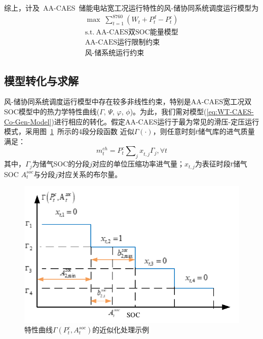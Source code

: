 综上，计及~AA-CAES~储能电站宽工况运行特性的风-储协同系统调度运行模型为\cite{CAES-Wind-Rui-19}
\begin{subequations}
\label{eq:WT-CAES-Co-Gen-Model}
\begin{gather}
\max \;\sum\limits_{t = 1}^{8760} {({W_t} + P_t^d - P_t^c)}\label{eq:CAES-Hub-dispatch-obj}\\
\mbox{s.t.}~
\mbox{AA-CAES双SOC能量模型}\\
\mbox{AA-CAES运行限制约束}\\
\mbox{风-储系统运行约束} 
\end{gather}
\end{subequations}

\subsection{模型转化与求解}
\label{sec:wind-ESS-operation-model-appro}

风-储协同系统调度运行模型中存在较多非线性约束，特别是AA-CAES宽工况双SOC模型中的热力学特性曲线($\Gamma$, $\Psi$, $\varphi$, $\phi$)。为此，我们需对模型(\ref{eq:WT-CAES-Co-Gen-Model})进行相应的转化。假定AA-CAES运行于最为常见的滑压-定压运行模式，采用图~\ref{fig:dual-SOC-approx}~所示的4段分段函数
\cite{CAES-Reserve-Bid-Therm-16}近似$\Gamma(\cdot)$，则任意时刻$t$储气库的进气质量满足\cite{CAES-Wind-Rui-19}：
\begin{equation}
\label{equ:non-dual-SOC-approx}
m_t^{ch} = P_t^c\sum\nolimits_j {x_{t,j}^{}} {\Gamma _j}, \forall t
\end{equation}
其中，$\Gamma_j$为储气SOC的分段$j$对应的单位压缩功率进气量；$x_{t,j}$为表征时段$t$储气SOC $A_t^{soc}$与分段$j$对应关系的布尔量。

\begin{figure}[H] %
  \centering
  \includegraphics[scale=0.85]{figures/Chap3-3-dual-SOC-approx.pdf}
  \caption{特性曲线$\Gamma \left( {P_t^c,A_t^{soc}} \right)$的近似化处理示例}
  \label{fig:dual-SOC-approx}
\end{figure}

